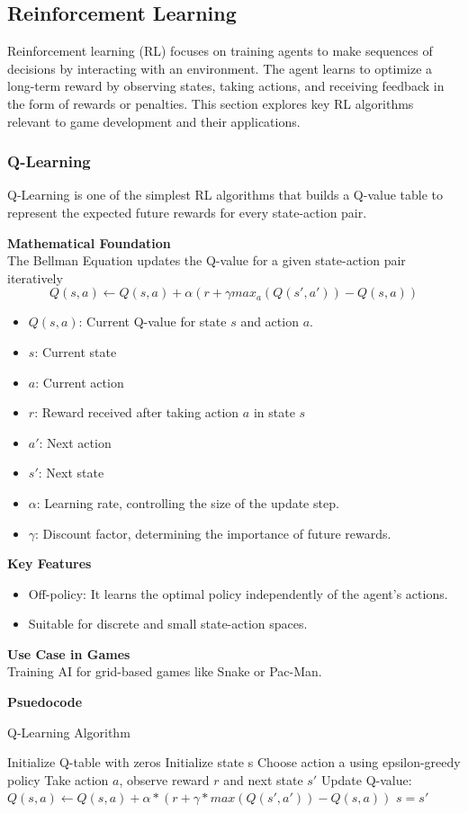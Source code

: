 \documentclass[12pt,oneside,openright,a4paper]{cpe-english-project}
\begin{document}
\subsection{Reinforcement Learning}
Reinforcement learning (RL) focuses on training agents to make sequences of decisions by interacting with an environment. The agent learns to optimize a long-term reward by observing states, taking actions, and receiving feedback in the form of rewards or penalties. This section explores key RL algorithms relevant to game development and their applications.
\subsubsection{Q-Learning}
Q-Learning is one of the simplest RL algorithms that builds a Q-value table to represent the expected future rewards for every state-action pair.\par
\textbf{Mathematical Foundation} \\
The Bellman Equation updates the Q-value for a given state-action pair iteratively
\begin{equation}
Q(s, a) \gets Q(s, a) + \alpha(r + \gamma max_{a}(Q(s', a')) - Q(s, a))
\end{equation}
\begin{itemize}
\item $Q(s,a)$: Current Q-value for state $s$ and action $a$.
\item $s$: Current state
\item $a$: Current action
\item $r$: Reward received after taking action $a$ in state $s$
\item $a'$: Next action
\item $s'$: Next state
\item $\alpha$: Learning rate, controlling the size of the update step.
\item $\gamma$: Discount factor, determining the importance of future rewards.
\end{itemize}
\textbf{Key Features}
\begin{itemize}
\item Off-policy: It learns the optimal policy independently of the agent’s actions.
\item Suitable for discrete and small state-action spaces.
\end{itemize}
\textbf{Use Case in Games} \\
Training AI for grid-based games like Snake or Pac-Man.\par
\textbf{Psuedocode}
\begin{algorithm}
\caption{Q-Learning Algorithm}\label{alg:QLA}
\begin{algorithmic}
\State Initialize Q-table with zeros
\State Initialize state s
	\State Choose action a using epsilon-greedy policy
	\State Take action $a$, observe reward $r$ and next state $s'$	
	\State  Update Q-value:
	\State  $Q(s, a) \gets Q(s, a) + \alpha * (r + \gamma * max(Q(s', a')) - Q(s, a))$
	\State $s = s'$
\EndWhile
\EndFor
\end{algorithmic}
\end{algorithm}
\end{document}
